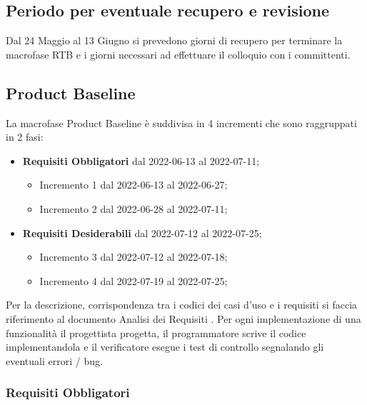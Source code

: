 \subsection*{Periodo per eventuale recupero e revisione}
Dal 24 Maggio al 13 Giugno si prevedono giorni di recupero per terminare la macrofase RTB e i giorni necessari ad effettuare il colloquio con i committenti.

\subsection{Product Baseline}
La macrofase Product Baseline è suddivisa in 4 incrementi che sono raggruppati in 2 fasi:
\begin{itemize}
    \item \textbf{Requisiti Obbligatori} dal 2022-06-13 al 2022-07-11;
            \begin{itemize}
                \item Incremento 1 dal 2022-06-13 al 2022-06-27;
                \item Incremento 2 dal 2022-06-28 al 2022-07-11;
            \end{itemize}
    \item \textbf{Requisiti Desiderabili} dal 2022-07-12 al 2022-07-25;
            \begin{itemize}
                \item Incremento 3 dal 2022-07-12 al 2022-07-18;
                \item Incremento 4 dal 2022-07-19 al 2022-07-25;
            \end{itemize}
\end{itemize}
Per la descrizione, corrispondenza tra i codici dei casi d'uso e i requisiti si faccia riferimento al documento Analisi dei Requisiti {\docVersionAdR}. \newline
Per ogni implementazione di una funzionalità il progettista progetta, il programmatore scrive il codice implementandola e il verificatore esegue i test di controllo segnalando gli eventuali errori / bug.
\subsubsection{Requisiti Obbligatori}
